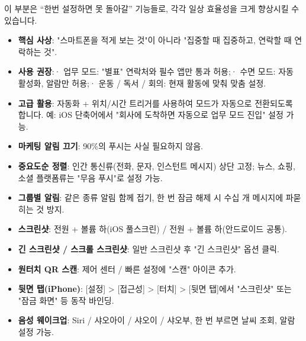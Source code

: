 
이 부분은 “한번 설정하면 못 돌아갈” 기능들로, 각각 일상 효율성을 크게 향상시킬 수 있습니다.


\begin{itemize}
  \item \textbf{핵심 사상}: "스마트폰을 적게 보는 것"이 아니라 "집중할 때 집중하고, 연락할 때 연락하는 것".
  \item \textbf{사용 권장}:\newline · 업무 모드: "별표" 연락처와 필수 앱만 통과 허용;\newline · 수면 모드: 자동 활성화, 알람만 허용;\newline · 운동 / 독서 / 회의: 현재 활동에 맞춰 맞춤 설정.
  \item \textbf{고급 활용}: 자동화 + 위치/시간 트리거를 사용하여 모드가 자동으로 전환되도록 합니다. 예: iOS 단축어에서 "회사에 도착하면 자동으로 업무 모드 진입" 설정 가능.
\end{itemize}


\begin{itemize}
  \item \textbf{마케팅 알림 끄기}: 90\%의 푸시는 사실 필요하지 않음.
  \item \textbf{중요도순 정렬}: 인간 통신류(전화, 문자, 인스턴트 메시지) 상단 고정; 뉴스, 쇼핑, 소셜 플랫폼류는 "무음 푸시"로 설정 가능.
  \item \textbf{그룹별 알림}: 같은 종류 알림 함께 접기, 한 번 잠금 해제 시 수십 개 메시지에 파묻히는 것 방지.
\end{itemize}


\begin{itemize}
  \item \textbf{스크린샷}: 전원 + 볼륨 하(iOS 풀스크린) / 전원 + 볼륨 하(안드로이드 공통).
  \item \textbf{긴 스크린샷 / 스크롤 스크린샷}: 일반 스크린샷 후 "긴 스크린샷" 옵션 클릭.
  \item \textbf{원터치 QR 스캔}: 제어 센터 / 빠른 설정에 "스캔" 아이콘 추가.
  \item \textbf{뒷면 탭(iPhone)}: [설정] > [접근성] > [터치] > [뒷면 탭]에서 "스크린샷" 또는 "잠금 화면" 등 동작 바인딩.
  \item \textbf{음성 웨이크업}: Siri / 샤오아이 / 샤오이 / 샤오부, 한 번 부르면 날씨 조회, 알람 설정 가능.
\end{itemize}

